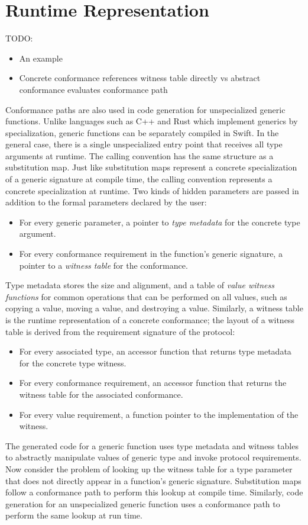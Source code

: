 \documentclass[a4paper,headsepline,bibliography=totoc,toc=flat,fleqn,twoside=semi]{scrbook}
\theoremstyle{definition}
\theoremstyle{definition}
\theoremstyle{definition}
\begin{document}
\section{Runtime Representation}

TODO:
\begin{itemize}
\item An example
\item Concrete conformance references witness table directly vs abstract conformance evaluates conformance path
\end{itemize}

Conformance paths are also used in code generation for unspecialized generic functions. Unlike languages such as C++ and Rust which implement generics by specialization, generic functions can be separately compiled in Swift. In the general case, there is a single unspecialized entry point that receives all type arguments at runtime. The calling convention has the same structure as a substitution map. Just like substitution maps represent a concrete specialization of a generic signature at compile time, the calling convention represents a concrete specialization at runtime. Two kinds of hidden parameters are passed in addition to the formal parameters declared by the user:
\begin{itemize}
\item For every generic parameter, a pointer to \emph{type metadata} for the concrete type argument.
\item For every conformance requirement in the function's generic signature, a pointer to a \emph{witness table} for the conformance.
\end{itemize}
Type metadata stores the size and alignment, and a table of \emph{value witness functions} for common operations that can be performed on all values, such as copying a value, moving a value, and destroying a value. Similarly, a witness table is the runtime representation of a concrete conformance; the layout of a witness table is derived from the requirement signature of the protocol:
\begin{itemize}
\item For every associated type, an accessor function that returns type metadata for the concrete type witness.
\item For every conformance requirement, an accessor function that returns the witness table for the associated conformance.
\item For every value requirement, a function pointer to the implementation of the witness.
\end{itemize}
The generated code for a generic function uses type metadata and witness tables to abstractly manipulate values of generic type and invoke protocol requirements. Now consider the problem of looking up the witness table for a type parameter that does not directly appear in a function's generic signature. Substitution maps follow a conformance path to perform this lookup at compile time. Similarly, code generation for an unspecialized generic function uses a conformance path to perform the same lookup at run time.
\end{document}
